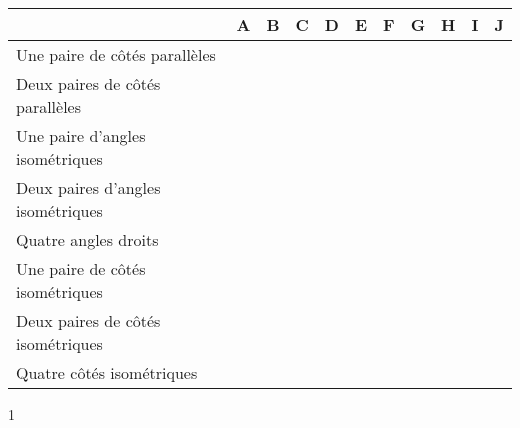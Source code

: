 \documentclass[a4paper,11pt]{report}
\begin{document}
\begin{exop}
{\begin{center}
    \end{center}
    

        \begin{center}
            \begin{tabular}{|p{7cm} *{10}{|p{4mm}}|}
             & A & B & C & D & E & F & G & H & I & J\\
                \hline
            Une paire de côtés parallèles &&&&&&&&&& \\
                \hline
            Deux paires de côtés parallèles   &&&&&&&&&& \\
                \hline
            Une paire d'angles isométriques    &&&&&&&&&& \\
                \hline
            Deux paires d'angles isométriques    &&&&&&&&&& \\
                \hline
            Quatre angles droits     &&&&&&&&&& \\
                \hline
            Une paire de côtés isométriques    &&&&&&&&&& \\
                \hline
            Deux paires de côtés isométriques   &&&&&&&&&& \\
                \hline
            Quatre côtés isométriques    &&&&&&&&&& \\
                \hline
            \end{tabular}
        \end{center}
}{1}
\end{exop}

\end{document}
